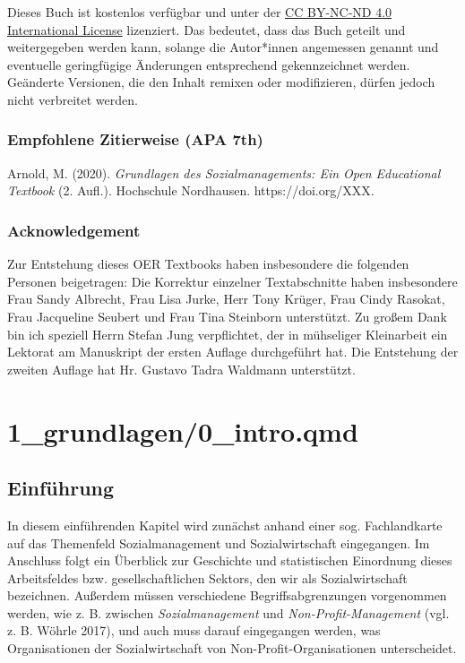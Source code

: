 \documentclass[
  letterpaper,
]{book}
\begin{document}
Dieses Buch ist kostenlos verfügbar und unter der
\href{https://creativecommons.org/licenses/by-nc-sa/4.0/}{CC BY-NC-ND
4.0 International License} lizenziert. Das bedeutet, dass das Buch
geteilt und weitergegeben werden kann, solange die Autor*innen
angemessen genannt und eventuelle geringfügige Änderungen entsprechend
gekennzeichnet werden. Geänderte Versionen, die den Inhalt remixen oder
modifizieren, dürfen jedoch nicht verbreitet werden.

\section*{Empfohlene Zitierweise (APA
7th)}\label{empfohlene-zitierweise-apa-7th}


Arnold, M. (2020). \emph{Grundlagen des Sozialmanagements: Ein Open
Educational Textbook} (2. Aufl.). Hochschule Nordhausen.
https://doi.org/XXX.

\section*{Acknowledgement}\label{acknowledgement}


Zur Entstehung dieses OER Textbooks haben insbesondere die folgenden
Personen beigetragen: Die Korrektur einzelner Textabschnitte haben
insbesondere Frau Sandy Albrecht, Frau Lisa Jurke, Herr Tony Krüger,
Frau Cindy Rasokat, Frau Jacqueline Seubert und Frau Tina Steinborn
unterstützt. Zu großem Dank bin ich speziell Herrn Stefan Jung
verpflichtet, der in mühseliger Kleinarbeit ein Lektorat am Manuskript
der ersten Auflage durchgeführt hat. Die Entstehung der zweiten Auflage
hat Hr. Gustavo Tadra Waldmann unterstützt.

\part{1\_grundlagen/0\_intro.qmd}

\chapter{Einführung}\label{einfuehrung}

In diesem einführenden Kapitel wird zunächst anhand einer sog.
Fachlandkarte auf das Themenfeld Sozialmanagement und Sozialwirtschaft
eingegangen. Im Anschluss folgt ein Überblick zur Geschichte und
statistischen Einordnung dieses Arbeitsfeldes bzw. gesellschaftlichen
Sektors, den wir als Sozialwirtschaft bezeichnen. Außerdem müssen
verschiedene Begriffsabgrenzungen vorgenommen werden, wie z. B. zwischen
\emph{Sozialmanagement} und \emph{Non-Profit-Management} (vgl. z. B.
Wöhrle 2017), und auch muss darauf eingegangen werden, was
Organisationen der Sozialwirtschaft von Non-Profit-Organisationen
unterscheidet.
\end{document}
